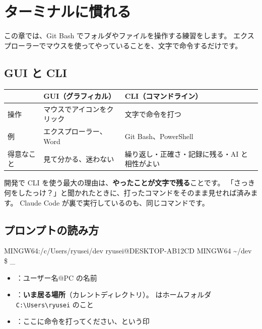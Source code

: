 \chapter{ターミナルに慣れる}

この章では、Git Bash でフォルダやファイルを操作する練習をします。
エクスプローラーでマウスを使ってやっていることを、文字で命令するだけです。

\section{GUI と CLI}

\begin{center}\small
\begin{tabularx}{\linewidth}{l X X}
\toprule
 & GUI（グラフィカル） & CLI（コマンドライン） \\
\midrule
操作 & マウスでアイコンをクリック & 文字で命令を打つ \\
例 & エクスプローラー、Word & Git Bash、PowerShell \\
得意なこと & 見て分かる、迷わない & 繰り返し・正確さ・記録に残る・AI と相性がよい \\
\bottomrule
\end{tabularx}
\end{center}

開発で CLI を使う最大の理由は、\textbf{やったことが文字で残る}ことです。
「さっき何をしたっけ？」と聞かれたときに、打ったコマンドをそのまま見せれば済みます。
Claude Code が裏で実行しているのも、同じコマンドです。

\section{プロンプトの読み方}

\begin{wintermwin}[0.85\linewidth]{MINGW64:/c/Users/ryusei/dev}
{\color{matcha!70!white}ryusei@DESKTOP-AB12CD} {\color{violet!50!white}MINGW64} {\color{kincha!80!white}\textasciitilde/dev}\\
\$ \_
\end{wintermwin}

\begin{itemize}
  \item {}：ユーザー名@PC の名前
  \item {}：\textbf{いま居る場所}（カレントディレクトリ）。\code{\textasciitilde} はホームフォルダ \verb|C:\Users\ryusei| のこと
  \item \code{\$}：ここに命令を打ってください、という印
\end{itemize}

